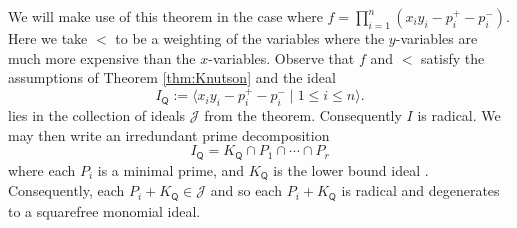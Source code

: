 \documentclass[10pt]{amsart}
\numberwithin{equation}{section}
\newtheorem{thm}{Theorem}[section]
\theoremstyle{definition}
\theoremstyle{remark}
\newcommand{\1}{^{-1}}
\def\Q{\mathsf{Q}}
\begin{document}

We will make use of this theorem in the case where $f = \prod_{i=1}^n (x_iy_i-p_i^+-p_i^-)$. Here we take $<$ to be a weighting of the variables where the $y$-variables are much more expensive than the $x$-variables. Observe that $f$ and $<$ satisfy the assumptions of Theorem \ref{thm:Knutson} and the ideal
\[ 
I_\Q := \langle x_iy_i-p_i^+-p_i^-\mid 1\leq i\leq n \rangle.
\]
lies in the collection of ideals $\mathcal{J}$ from the theorem. 
Consequently $I$ is radical. We may then write an irredundant prime decomposition 
\begin{equation}\label{primeDecompositionl}
I_\Q = K_\Q\cap P_1\cap\cdots \cap P_r
\end{equation}
where each $P_i$ is a minimal prime, and $K_\Q$ is the lower bound ideal \cite[Lemma 5.7]{BMRS15}. Consequently, each $P_i+K_\Q\in \mathcal{J}$ and so each $P_i+K_\Q$ is radical and degenerates to a squarefree monomial ideal. 
\end{document}
